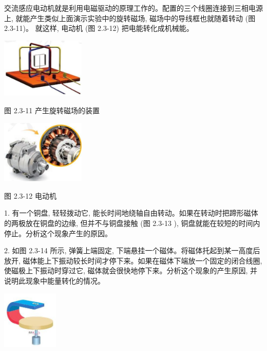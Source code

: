 \documentclass[10pt]{article}
\begin{document}
交流感应电动机就是利用电磁驱动的原理工作的。配置的三个线圈连接到三相电源上, 就能产生类似上面演示实验中的旋转磁场, 磁场中的导线框也就随着转动 (图 2.3-11)。 就这样, 电动机 (图 2.3-12) 把电能转化成机械能。

\begin{center}
\includegraphics[max width=0.3\textwidth]{images/01910e72-c5b7-7ed5-a6d4-fb3a5faefc32_43_577212.jpg}
\end{center}

图 2.3-11 产生旋转磁场的装置

\begin{center}
\includegraphics[max width=0.3\textwidth]{images/01910e72-c5b7-7ed5-a6d4-fb3a5faefc32_43_698949.jpg}
\end{center}

图 2.3-12 电动机

1. 有一个铜盘, 轻轻拨动它, 能长时间地绕轴自由转动。如果在转动时把蹄形磁体的两极放在铜盘的边缘, 但并不与铜盘接触 (图 2.3-13 ), 铜盘就能在较短的时间内停止。分析这个现象产生的原因。

2. 如图 2.3-14 所示, 弹簧上端固定, 下端悬挂一个磁体。将磁体托起到某一高度后放开, 磁体能上下振动较长时间才停下来。如果在磁体下端放一个固定的闭合线圈, 使磁极上下振动时穿过它, 磁体就会很快地停下来。分析这个现象的产生原因, 并说明此现象中能量转化的情况。

\begin{center}
\includegraphics[max width=0.2\textwidth]{images/01910e72-c5b7-7ed5-a6d4-fb3a5faefc32_44_160166.jpg}
\end{center}
\end{document}
